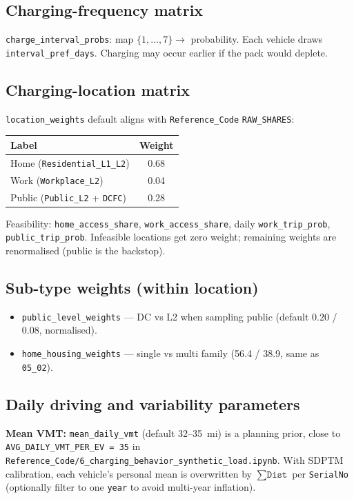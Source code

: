 \documentclass[11pt,a4paper]{article}
\begin{document}
\subsection{Charging-frequency matrix}
\texttt{charge\_interval\_probs}: map $\{1,\ldots,7\} \to$ probability. Each vehicle draws \texttt{interval\_pref\_days}. Charging may occur earlier if the pack would deplete.

\subsection{Charging-location matrix}
\texttt{location\_weights} default aligns with \texttt{Reference\_Code} \texttt{RAW\_SHARES}:
\begin{center}
\begin{tabular}{lc}
\toprule
Label & Weight \\
\midrule
Home (\texttt{Residential\_L1\_L2}) & 0.68 \\
Work (\texttt{Workplace\_L2}) & 0.04 \\
Public (\texttt{Public\_L2} + \texttt{DCFC}) & 0.28 \\
\bottomrule
\end{tabular}
\end{center}
Feasibility: \texttt{home\_access\_share}, \texttt{work\_access\_share}, daily \texttt{work\_trip\_prob}, \texttt{public\_trip\_prob}. Infeasible locations get zero weight; remaining weights are renormalised (public is the backstop).

\subsection{Sub-type weights (within location)}
\begin{itemize}[noitemsep]
  \item \texttt{public\_level\_weights} --- DC vs L2 when sampling public (default $0.20$ / $0.08$, normalised).
  \item \texttt{home\_housing\_weights} --- single vs multi family (56.4 / 38.9, same as \texttt{05\_02}).
\end{itemize}

\subsection{Daily driving and variability parameters}
\textbf{Mean VMT:} \texttt{mean\_daily\_vmt} (default 32--35~mi) is a planning prior, close to \texttt{AVG\_DAILY\_VMT\_PER\_EV = 35} in \texttt{Reference\_Code/6\_charging\_behavior\_synthetic\_load.ipynb}. With SDPTM calibration, each vehicle's personal mean is overwritten by $\sum \texttt{Dist}$ per \texttt{SerialNo} (optionally filter to one \texttt{year} to avoid multi-year inflation).
\end{document}
